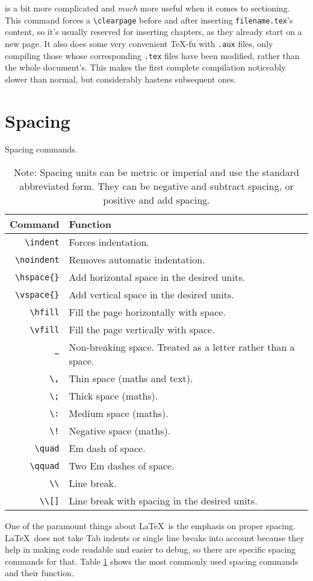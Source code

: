 \verb|| is a bit more complicated and \emph{much}
more useful when it comes to sectioning.  This command forces a
\verb|\clearpage| before and after inserting \texttt{filename.tex}'s
content, so it's usually reserved for inserting chapters, as they
already start on a new page.  It also does some very convenient
\TeX-fu with \texttt{.aux} files, only compiling those whose
corresponding \texttt{.tex} files have been modified, rather than the
whole document's.  This makes the first complete compilation
noticeably slower than normal, but considerably hastens subsequent
ones.
%
\section{Spacing}
%
\begin{table}[!htbp]
  \centering
  \caption{Spacing commands.}
  \label{t:space}
  \begin{tabular}{rl}
    \toprule
    Command & Function \\
    \midrule
    \verb|\indent| & Forces indentation. \\
    \verb|\noindent| & Removes automatic indentation. \\
    \verb|\hspace{}| & Add horizontal space in the desired units. \\
    \verb|\vspace{}| & Add vertical space in the desired units. \\
    \verb|\hfill| & Fill the page horizontally with space. \\
    \verb|\vfill| & Fill the page vertically with space. \\
    \verb|~| & Non-breaking space. Treated as a letter rather than a space. \\
    \verb|\,| & Thin space (maths and text). \\
    \verb|\;| & Thick space (maths). \\
    \verb|\:| & Medium space (maths). \\
    \verb|\!| & Negative space (maths). \\
    \verb|\quad| & Em dash of space. \\
    \verb|\qquad| & Two Em dashes of space. \\
    \verb|\\| & Line break. \\
    \verb|\\[]| & Line break with spacing in the desired units. \\
    \bottomrule
  \end{tabular}
  \vspace{0.1cm}
  \caption*{Note: Spacing units can be metric or imperial and use the
    standard abbreviated form.  They can be negative and subtract spacing,
    or positive and add spacing.}
\end{table}
One of the paramount things about \LaTeX~is the emphasis on proper
spacing.  \LaTeX~does not take Tab indents or single line breaks into
account because they help in making code readable and easier to debug,
so there are specific spacing commands for that.  Table \ref{t:space}
shows the most commonly used spacing commands and their function.
%
